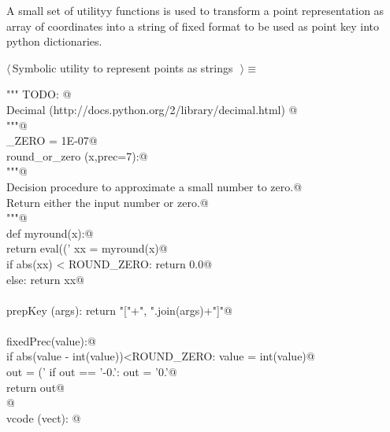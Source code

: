 \documentclass[11pt,oneside]{article}	%
\begin{document}
A small set of utilityy functions is used to transform a point representation as array of coordinates into a string of fixed format to be used as point key into python dictionaries.

\begin{flushleft} \small \label{scrap52}
$\langle\,$Symbolic utility to represent points as strings\nobreak\ {\footnotesize {}}$\,\rangle\equiv$
\vspace{-1ex}
\begin{list}{}{} \item
\mbox{}\verb@""" TODO: @\\
\mbox{}\verb@use Decimal (http://docs.python.org/2/library/decimal.html) @\\
\mbox{}\verb@"""@\\
\mbox{}\verb@ROUND_ZERO = 1E-07@\\
\mbox{}\verb@def round_or_zero (x,prec=7):@\\
\mbox{}\verb@   """@\\
\mbox{}\verb@   Decision procedure to approximate a small number to zero.@\\
\mbox{}\verb@   Return either the input number or zero.@\\
\mbox{}\verb@   """@\\
\mbox{}\verb@   def myround(x):@\\
\mbox{}\verb@      return eval(('%.'+str(prec)+'f') % round(x,prec))@\\
\mbox{}\verb@   xx = myround(x)@\\
\mbox{}\verb@   if abs(xx) < ROUND_ZERO: return 0.0@\\
\mbox{}\verb@   else: return xx@\\
\mbox{}\verb@@\\
\mbox{}\verb@def prepKey (args): return "["+", ".join(args)+"]"@\\
\mbox{}\verb@@\\
\mbox{}\verb@def fixedPrec(value):@\\
\mbox{}\verb@   if abs(value - int(value))<ROUND_ZERO: value = int(value)@\\
\mbox{}\verb@   out = ('%0.7f'% value).rstrip('0')@\\
\mbox{}\verb@   if out == '-0.': out = '0.'@\\
\mbox{}\verb@   return out@\\
\mbox{}\verb@   @\\
\mbox{}\verb@def vcode (vect): @\\

\end{list}
\end{flushleft}
\end{document}
